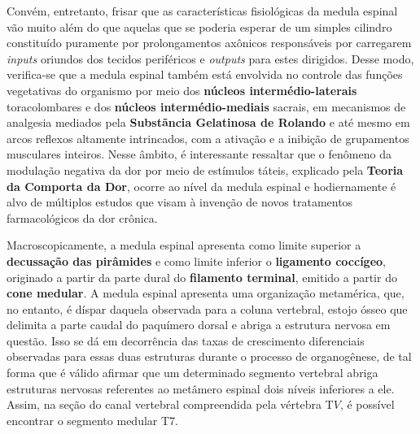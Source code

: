 \documentclass[
]{book}
\theoremstyle{definition}
\theoremstyle{definition}
\theoremstyle{definition}
\theoremstyle{definition}
\theoremstyle{remark}
\begin{document}
Convém, entretanto, frisar que as características fisiológicas da medula espinal vão muito além do que aquelas que se poderia esperar de um simples cilindro constituído puramente por prolongamentos axônicos responsáveis por carregarem \emph{inputs} oriundos dos tecidos periféricos e \emph{outputs} para estes dirigidos. Desse modo, verifica-se que a medula espinal também está envolvida no controle das funções vegetativas do organismo por meio dos \textbf{núcleos intermédio-laterais} toracolombares e dos \textbf{núcleos intermédio-mediais} sacrais, em mecanismos de analgesia mediados pela \textbf{Substãncia Gelatinosa de Rolando} e até mesmo em arcos reflexos altamente intrincados, com a ativação e a inibição de grupamentos musculares inteiros. Nesse âmbito, é interessante ressaltar que o fenômeno da modulação negativa da dor por meio de estímulos táteis, explicado pela \textbf{Teoria da Comporta da Dor}, ocorre ao nível da medula espinal e hodiernamente é alvo de múltiplos estudos que visam à invenção de novos tratamentos farmacológicos da dor crônica.

Macroscopicamente, a medula espinal apresenta como limite superior a \textbf{decussação das pirâmides} e como limite inferior o \textbf{ligamento coccígeo}, originado a partir da parte dural do \textbf{filamento terminal}, emitido a partir do \textbf{cone medular}. A medula espinal apresenta uma organização metamérica, que, no entanto, é díspar daquela observada para a coluna vertebral, estojo ósseo que delimita a parte caudal do paquímero dorsal e abriga a estrutura nervosa em questão. Isso se dá em decorrência das taxas de crescimento diferenciais observadas para essas duas estruturas durante o processo de organogênese, de tal forma que é válido afirmar que um determinado segmento vertebral abriga estruturas nervosas referentes ao metâmero espinal dois níveis inferiores a ele. Assim, na seção do canal vertebral compreendida pela vértebra T\(V\), é possível encontrar o segmento medular T7.
\end{document}
